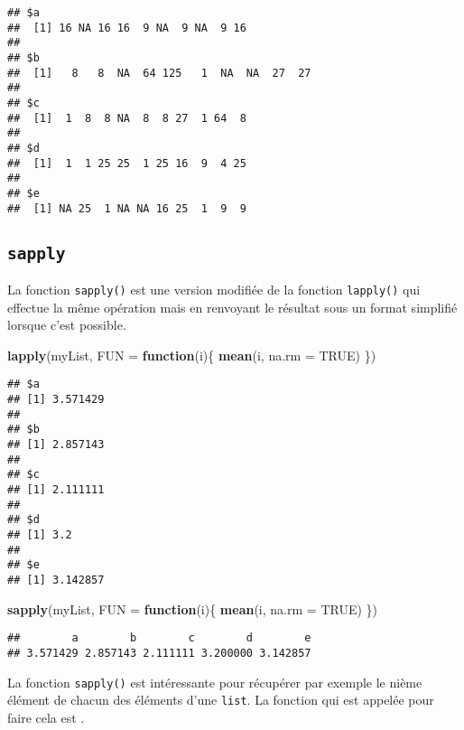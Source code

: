 \documentclass[]{book}
\newenvironment{Shaded}{\begin{snugshade}}{\end{snugshade}}
\newcommand{\KeywordTok}[1]{\textcolor[rgb]{0.13,0.29,0.53}{\textbf{#1}}}
\newcommand{\DataTypeTok}[1]{\textcolor[rgb]{0.13,0.29,0.53}{#1}}
\newcommand{\OtherTok}[1]{\textcolor[rgb]{0.56,0.35,0.01}{#1}}
\newcommand{\ControlFlowTok}[1]{\textcolor[rgb]{0.13,0.29,0.53}{\textbf{#1}}}
\newcommand{\NormalTok}[1]{#1}
\theoremstyle{definition}
\theoremstyle{definition}
\theoremstyle{definition}
\theoremstyle{remark}
\begin{document}
\begin{verbatim}
## $a
##  [1] 16 NA 16 16  9 NA  9 NA  9 16
## 
## $b
##  [1]   8   8  NA  64 125   1  NA  NA  27  27
## 
## $c
##  [1]  1  8  8 NA  8  8 27  1 64  8
## 
## $d
##  [1]  1  1 25 25  1 25 16  9  4 25
## 
## $e
##  [1] NA 25  1 NA NA 16 25  1  9  9
\end{verbatim}

\subsection{\texorpdfstring{\texttt{sapply}}{sapply}}\label{l17lapply}

La fonction \texttt{sapply()} est une version modifiée de la fonction
\texttt{lapply()} qui effectue la même opération mais en renvoyant le
résultat sous un format simplifié lorsque c'est possible.

\begin{Shaded}
\begin{Highlighting}[]
\KeywordTok{lapply}\NormalTok{(myList, }\DataTypeTok{FUN =} \ControlFlowTok{function}\NormalTok{(i)\{}
  \KeywordTok{mean}\NormalTok{(i, }\DataTypeTok{na.rm =} \OtherTok{TRUE}\NormalTok{)}
\NormalTok{\})}
\end{Highlighting}
\end{Shaded}

\begin{verbatim}
## $a
## [1] 3.571429
## 
## $b
## [1] 2.857143
## 
## $c
## [1] 2.111111
## 
## $d
## [1] 3.2
## 
## $e
## [1] 3.142857
\end{verbatim}

\begin{Shaded}
\begin{Highlighting}[]
\KeywordTok{sapply}\NormalTok{(myList, }\DataTypeTok{FUN =} \ControlFlowTok{function}\NormalTok{(i)\{}
  \KeywordTok{mean}\NormalTok{(i, }\DataTypeTok{na.rm =} \OtherTok{TRUE}\NormalTok{)}
\NormalTok{\})}
\end{Highlighting}
\end{Shaded}

\begin{verbatim}
##        a        b        c        d        e 
## 3.571429 2.857143 2.111111 3.200000 3.142857
\end{verbatim}

La fonction \texttt{sapply()} est intéressante pour récupérer par
exemple le nième élément de chacun des éléments d'une \texttt{list}. La
fonction qui est appelée pour faire cela est
\texttt{\textquotesingle{}{[}{[}\textquotesingle{}}.
\end{document}
